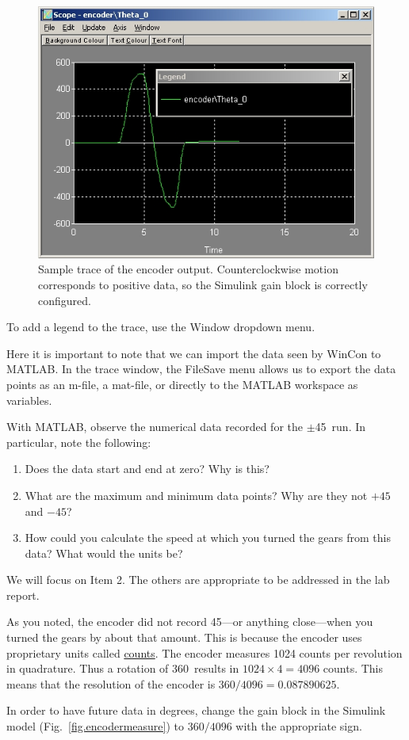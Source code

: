 \begin{figure}[bht]
\centering
\includegraphics[width=.6\textwidth]{angletrace}
\caption{\footnotesize
        Sample trace of the encoder output.  Counterclockwise motion corresponds to positive data, so the Simulink gain block is correctly configured.
        \label{fig.angletrace}
        }
\end{figure}

To add a legend to the trace, use the Window dropdown menu.
\par
Here it is important to note that we can import the data seen by WinCon to MATLAB.  In the trace window, the File\textrightarrow Save menu allows us to export the data points as an m-file, a mat-file, or directly to the MATLAB workspace as variables.
\par
With MATLAB, observe the numerical data recorded for the $\pm$45\textdegree\  run.  In particular, note the following:
\begin{enumerate}
\item
    Does the data start and end at zero?  Why is this?
\item
    What are the maximum and minimum data points?  Why are they not $+45$ and $-45$?
\item
    How could you calculate the speed at which you turned the gears from this data?  What would the units be?
\end{enumerate}

We will focus on Item 2.  The others are appropriate to be addressed in the lab report.
\par
As you noted, the encoder did not record 45\textdegree---or anything close---when you turned the gears by about that amount.  This is because the encoder uses proprietary units called \uline{counts}.  The encoder measures 1024 counts per revolution in quadrature.  Thus a rotation of 360\textdegree\  results in $1024\times4 = 4096$ counts.  This means that the resolution of the encoder is $360/4096 = 0.087890625$\textdegree.
\par
In order to have future data in degrees, change the gain block in the Simulink model (Fig.\ \ref{fig.encodermeasure}) to $360/4096$ with the appropriate sign.

